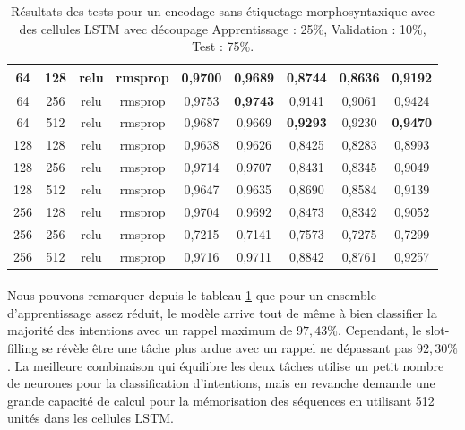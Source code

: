 \begin{table}[H]
{\begin{tabular}{|c|c|c|c|c|c|c|c|c|}
				64 & 128 & relu & rmsprop & 0,9700 & 0,9689 & 0,8744 & 0,8636 & 0,9192 \\ \hline
				64 & 256 & relu & rmsprop & 0,9753 & \textbf{0,9743} & 0,9141 & 0,9061 & 0,9424 \\ \hline
				\rowcolor[HTML]{96FFFB} 
				64 & 512 & relu & rmsprop & 0,9687 & 0,9669 & \textbf{0,9293} & 0,9230 & \textbf{0,9470} \\ \hline
				128 & 128 & relu & rmsprop & 0,9638 & 0,9626 & 0,8425 & 0,8283 & 0,8993 \\ \hline
				128 & 256 & relu & rmsprop & 0,9714 & 0,9707 & 0,8431 & 0,8345 & 0,9049 \\ \hline
				128 & 512 & relu & rmsprop & 0,9647 & 0,9635 & 0,8690 & 0,8584 & 0,9139 \\ \hline
				256 & 128 & relu & rmsprop & 0,9704 & 0,9692 & 0,8473 & 0,8342 & 0,9052 \\ \hline
				256 & 256 & relu & rmsprop & 0,7215 & 0,7141 & 0,7573 & 0,7275 & 0,7299 \\ \hline
				256 & 512 & relu & rmsprop & 0,9716 & 0,9711 & 0,8842 & 0,8761 & 0,9257 \\ \hline
			\end{tabular}%
		}
		\caption{Résultats des tests pour un encodage sans étiquetage morphosyntaxique avec des cellules LSTM avec découpage Apprentissage : 25\%, Validation : 10\%, Test : 75\%.}
		\label{tab:lstm_1}
	\end{table}
	
	\paragraph{}
	Nous pouvons remarquer depuis le tableau \ref{tab:lstm_1} que pour un ensemble d'apprentissage assez réduit, le modèle arrive tout de même à bien classifier la majorité des intentions avec un rappel maximum de $97,43\%$. Cependant, le slot-filling se révèle être une tâche plus ardue avec un rappel ne dépassant pas $92,30\%$. La meilleure combinaison qui équilibre les deux tâches utilise un petit nombre de neurones pour la classification d'intentions, mais en revanche demande une grande capacité de calcul pour la mémorisation des séquences en utilisant 512 unités dans les cellules LSTM.
	

